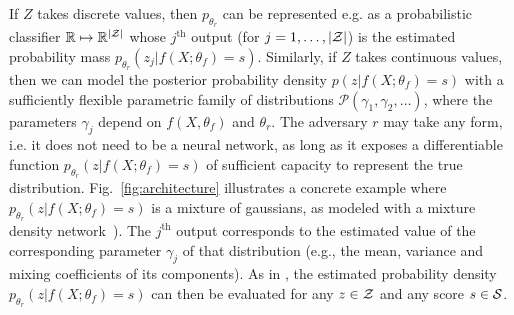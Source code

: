 \documentclass{article}
\theoremstyle{plain}
\begin{document}
If $Z$ takes discrete values, then $p_{\theta_r}$ can be represented e.g. as a
probabilistic classifier $\mathbb{R} \mapsto \mathbb{R}^{|{\cal Z|}}$ whose
$j^\textrm{th}$ output (for $j=1, \dots, |{\cal Z}|$) is the estimated probability mass
$p_{\theta_r}(z_j|f(X;\theta_f)=s)$. Similarly, if $Z$ takes continuous values,
then we can model the posterior probability density $p(z | f(X;\theta_f)=s)$
with a sufficiently flexible  parametric family of distributions $\mathcal{P}(\gamma_1, \gamma_2, \dots)$,
where the parameters $\gamma_j$ depend on $f(X, \theta_f)$ and $\theta_r$.
The adversary $r$ may
take any form, i.e. it does not need to be a neural network, as long as it exposes a
differentiable function $p_{\theta_r}(z|f(X;\theta_f)=s)$ of sufficient capacity
to represent the true distribution. Fig.~\ref{fig:architecture} illustrates
a concrete example where $p_{\theta_r}(z | f(X;\theta_f)=s)$ is a mixture of
gaussians, as modeled with a mixture density network~\citep{bishop1994mixture}).
The $j^\textrm{th}$ output corresponds to the estimated value of the
corresponding parameter $\gamma_j$ of that distribution (e.g., the mean,
variance and mixing coefficients of its components). As in
\citep{nix1994estimating,bishop1994mixture}, the estimated probability density
$p_{\theta_r}(z|f(X;\theta_f)=s)$ can then be evaluated for any $z \in {\cal Z}$ and any score $s \in {\cal S}$.

\end{document}
